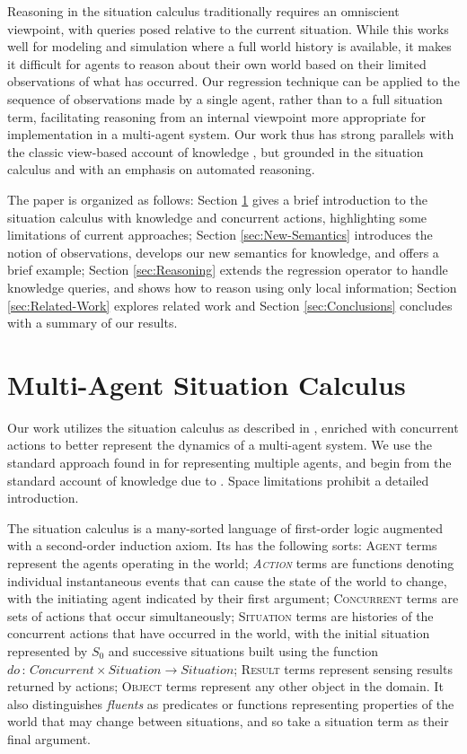 \documentclass{ifaamas-submission}
\newcommand{\noun}[1]{\textsc{#1}}
\begin{document}
Reasoning in the situation calculus traditionally requires an omniscient
viewpoint, with queries posed relative to the current situation. While
this works well for modeling and simulation where a full world history
is available, it makes it difficult for agents to reason about their
own world based on their limited observations of what has occurred.
Our regression technique can be applied to the sequence of observations
made by a single agent, rather than to a full situation term, facilitating
reasoning from an internal viewpoint more appropriate for implementation
in a multi-agent system. Our work thus has strong parallels with the
classic view-based account of knowledge \cite{halpern90knowledge_distrib},
but grounded in the situation calculus and with an emphasis on automated
reasoning.

The paper is organized as follows: Section \ref{sec:ma-sitcalc} gives
a brief introduction to the situation calculus with knowledge and
concurrent actions, highlighting some limitations of current approaches;
Section \ref{sec:New-Semantics} introduces the notion of observations,
develops our new semantics for knowledge, and offers a brief example;
Section \ref{sec:Reasoning} extends the regression operator to handle
knowledge queries, and shows how to reason using only local information;
Section \ref{sec:Related-Work} explores related work and Section
\ref{sec:Conclusions} concludes with a summary of our results.


\section{Multi-Agent Situation Calculus}

\label{sec:ma-sitcalc}Our work utilizes the situation calculus as
described in \cite{pirri99contributions_sitcalc}, enriched with concurrent
actions \cite{reiter96sc_nat_conc} to better represent the dynamics
of a multi-agent system. We use the standard approach found in \cite{shapiro01casl_feat_inter}
for representing multiple agents, and begin from the standard account
of knowledge due to \cite{scherl03sc_knowledge}. Space limitations prohibit a detailed introduction.

The situation calculus is a many-sorted language of first-order logic
augmented with a second-order induction axiom. Its has the following
sorts: \noun{Agent} terms represent the agents operating in the world;
\emph{\noun{Action}} terms are functions denoting individual instantaneous
events that can cause the state of the world to change, with the initiating
agent indicated by their first argument; \noun{Concurrent} terms are
sets of actions that occur simultaneously; \noun{Situation} terms
are histories of the concurrent actions that have occurred in the
world, with the initial situation represented by $S_{0}$ and successive
situations built using the function $do\,:\, Concurrent\times Situation\rightarrow Situation$;
\noun{Result} terms represent sensing results returned by actions;
\noun{Object} terms represent any other object in the domain. It also
distinguishes \emph{fluents} as predicates or functions representing
properties of the world that may change between situations, and so
take a situation term as their final argument.
\end{document}
